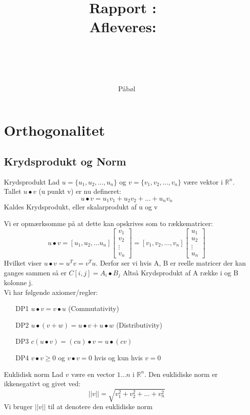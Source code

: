 \documentclass[a4paper,fleqn]{article}
\title{Rapport}
\author{P\aa b\o l}
\title{
	\vspace{2in}
	\textmd{\textbf{\hmwkClass:\ \hmwkTitle}}\\
	\normalsize\vspace{0.1in}\small{Afleveres:\ \hmwkDueDate}\\
	\vspace{0.1in}\large{\textit{\hmwkClassInstructor}}\\
	\normalsize\vspace{0.5in} \hmwkProblem  \\
	\vspace{3in}
}
\author{\textbf{\hmwkAuthorName}}
\newcommand{\RR}{\mathbb{R}}
\begin{document}
	\maketitle
	\newpage
	\tableofcontents
	\setcounter{page}{1}
	\setcounter{section}{3}
	\section{Orthogonalitet}
	\subsection{Krydsprodukt og Norm}
	\begin{definition}{Krydsprodukt}{}
		Lad $u = \{ u_1, u_2, \dots, u_n\}$ og $v = \{ v_1, v_2, \dots, v_n\}$ være vektor
		i $\RR^n$. Tallet $u \bullet v$ (u punkt v) er nu defineret: 
		\[ u \bullet v = u_1 v_1 + u_2 v_2 + \dots + u_n v_n \]
		Kaldes Krydsprodukt, eller skalarprodukt af u og v
	\end{definition}
	Vi er opmærksomme på at dette kan opskrives som to rækkematricer:
	\[ u \bullet v = \left[u_1, u_2, \dots u_n\right] \begin{bmatrix}v_1\\v_2\\\vdots\\v_n
		\end{bmatrix} = \left[v_1, v_2, \dots, v_n \right]\begin{bmatrix}u_1\\u_2\\
		\vdots\\u_n\end{bmatrix}
	\]Hvilket viser $u \bullet v = u^Tv = v^Tu$. Derfor ser vi hvis A, B er reelle matricer der
	kan ganges sammen så er $C[i,j] = A_i \bullet B_j$ Altså Krydsprodukt af A række i og B
	kolonne j.\\

	Vi har følgende axiomer/regler:
	\begin{itemize}
		\item[DP1] $u\bullet v = v\bullet u$ (Commutativity)
		\item[DP2] $u \bullet(v+w) = u\bullet v + u\bullet w$ (Distributivity)
		\item[DP3] $c(u\bullet v) = (cu)\bullet v = u\bullet (cv)$
		\item[DP4] $v \bullet v \geq 0$ og $v\bullet v = 0$ hvis og kun hvis $v = 0$
	\end{itemize}
	\begin{definition}{Euklidisk norm}{}
		Lad $v$ være en vector $1\dots n$ i $\RR^n$. Den euklidiske norm er ikkenegativt og
		givet ved:
		\[ ||v|| = \sqrt{v^2_1 + v^2_2 + \dots + v^2_n}\]
		Vi bruger $||v||$ til at denotere den euklidiske norm
	\end{definition}
\end{document}
